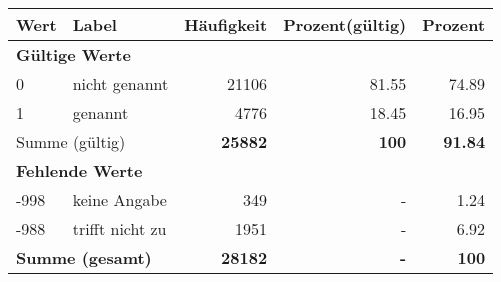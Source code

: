      \begin{longtable}{lXrrr}
     \toprule
     \textbf{Wert} & \textbf{Label} & \textbf{Häufigkeit} & \textbf{Prozent(gültig)} & \textbf{Prozent} \\
     \endhead
     \midrule
     \multicolumn{5}{l}{\textbf{Gültige Werte}}\\

     0 &
     \multicolumn{1}{X}{ nicht genannt   } &


       \num{21106} &
       \num[round-mode=places,round-precision=2]{81,55} &
         \num[round-mode=places,round-precision=2]{74,89} \\

     1 &
     \multicolumn{1}{X}{ genannt   } &


       \num{4776} &
       \num[round-mode=places,round-precision=2]{18,45} &
         \num[round-mode=places,round-precision=2]{16,95} \\
     \midrule
     \multicolumn{2}{l}{Summe (gültig)} &
       \textbf{\num{25882}} &
     \textbf{100} &
       \textbf{\num[round-mode=places,round-precision=2]{91,84}} \\
     \multicolumn{5}{l}{\textbf{Fehlende Werte}}\\
       -998 &
       keine Angabe &
         \num{349} &
        - &
         \num[round-mode=places,round-precision=2]{1,24} \\
       -988 &
       trifft nicht zu &
         \num{1951} &
        - &
         \num[round-mode=places,round-precision=2]{6,92} \\
     \midrule
     \multicolumn{2}{l}{\textbf{Summe (gesamt)}} &
          \textbf{\num{28182}} &
        \textbf{-} &
        \textbf{100} \\
     \bottomrule
     \end{longtable}
     
